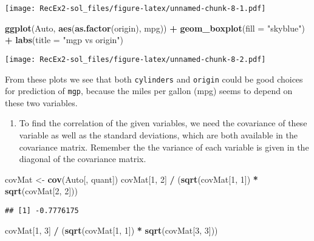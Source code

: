 \documentclass[
]{article}
\newenvironment{Shaded}{\begin{snugshade}}{\end{snugshade}}
\newcommand{\AttributeTok}[1]{\textcolor[rgb]{0.13,0.29,0.53}{#1}}
\newcommand{\DecValTok}[1]{\textcolor[rgb]{0.00,0.00,0.81}{#1}}
\newcommand{\FunctionTok}[1]{\textcolor[rgb]{0.13,0.29,0.53}{\textbf{#1}}}
\newcommand{\NormalTok}[1]{#1}
\newcommand{\OtherTok}[1]{\textcolor[rgb]{0.56,0.35,0.01}{#1}}
\newcommand{\SpecialCharTok}[1]{\textcolor[rgb]{0.81,0.36,0.00}{\textbf{#1}}}
\newcommand{\StringTok}[1]{\textcolor[rgb]{0.31,0.60,0.02}{#1}}
\providecommand{\tightlist}{%
  \setlength{\itemsep}{0pt}\setlength{\parskip}{0pt}}
\begin{document}
\texttt{[image: RecEx2-sol\_files/figure-latex/unnamed-chunk-8-1.pdf]}

\begin{Shaded}
\begin{Highlighting}[]
\FunctionTok{ggplot}\NormalTok{(Auto, }\FunctionTok{aes}\NormalTok{(}\FunctionTok{as.factor}\NormalTok{(origin), mpg)) }\SpecialCharTok{+} 
  \FunctionTok{geom\_boxplot}\NormalTok{(}\AttributeTok{fill =} \StringTok{"skyblue"}\NormalTok{) }\SpecialCharTok{+} 
  \FunctionTok{labs}\NormalTok{(}\AttributeTok{title =} \StringTok{"mgp vs origin"}\NormalTok{) }
\end{Highlighting}
\end{Shaded}

\texttt{[image: RecEx2-sol\_files/figure-latex/unnamed-chunk-8-2.pdf]}

From these plots we see that both \texttt{cylinders} and \texttt{origin}
could be good choices for prediction of \texttt{mgp}, because the miles
per gallon (mpg) seems to depend on these two variables.

\begin{enumerate}
\def\labelenumi{\alph{enumi})}
\setcounter{enumi}{6}
\tightlist
\item
  To find the correlation of the given variables, we need the covariance
  of these variable as well as the standard deviations, which are both
  available in the covariance matrix. Remember the the variance of each
  variable is given in the diagonal of the covariance matrix.
\end{enumerate}

\begin{Shaded}
\begin{Highlighting}[]
\NormalTok{covMat }\OtherTok{\textless{}{-}} \FunctionTok{cov}\NormalTok{(Auto[, quant])}
\NormalTok{covMat[}\DecValTok{1}\NormalTok{, }\DecValTok{2}\NormalTok{] }\SpecialCharTok{/}\NormalTok{ (}\FunctionTok{sqrt}\NormalTok{(covMat[}\DecValTok{1}\NormalTok{, }\DecValTok{1}\NormalTok{]) }\SpecialCharTok{*} \FunctionTok{sqrt}\NormalTok{(covMat[}\DecValTok{2}\NormalTok{, }\DecValTok{2}\NormalTok{]))}
\end{Highlighting}
\end{Shaded}

\begin{verbatim}
## [1] -0.7776175
\end{verbatim}

\begin{Shaded}
\begin{Highlighting}[]
\NormalTok{covMat[}\DecValTok{1}\NormalTok{, }\DecValTok{3}\NormalTok{] }\SpecialCharTok{/}\NormalTok{ (}\FunctionTok{sqrt}\NormalTok{(covMat[}\DecValTok{1}\NormalTok{, }\DecValTok{1}\NormalTok{]) }\SpecialCharTok{*} \FunctionTok{sqrt}\NormalTok{(covMat[}\DecValTok{3}\NormalTok{, }\DecValTok{3}\NormalTok{]))}
\end{Highlighting}
\end{Shaded}
\end{document}
